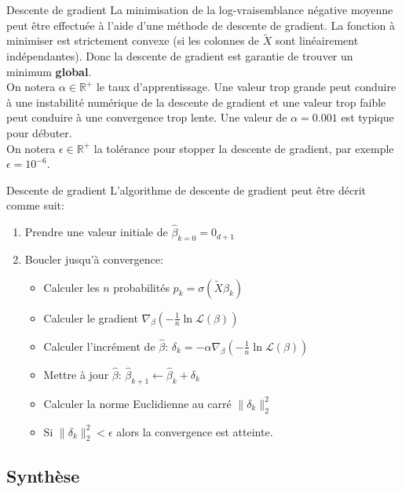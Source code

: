 \begin{frame}{Descente de gradient}
	La minimisation de la log-vraisemblance négative moyenne peut être effectuée à l'aide d'une méthode de descente de gradient. La fonction à minimiser est strictement convexe (si les colonnes de $\tilde{X}$ sont linéairement indépendantes). Donc la descente de gradient est garantie de trouver un minimum \textbf{global}. \\
	\vspace{0.5cm}
	On notera $\alpha \in \mathbb{R}^+$ le taux d'apprentissage. Une valeur trop grande peut conduire à une instabilité numérique de la descente de gradient et une valeur trop faible peut conduire à une convergence trop lente. Une valeur de $\alpha = 0.001$ est typique pour débuter. \\
	\vspace{0.5cm}
	On notera $\epsilon \in \mathbb{R}^+$ la tolérance pour stopper la descente de gradient, par exemple $\epsilon = 10^{-6}$.
\end{frame}

\begin{frame}{Descente de gradient}
	L'algorithme de descente de gradient peut être décrit comme suit:
	\begin{enumerate}
		\item Prendre une valeur initiale de $\hat{\beta}_{k=0} = 0_{d+1}$
		\item Boucler jusqu'à convergence:
		\begin{itemize}
			\item Calculer les $n$ probabilités $p_k = \sigma(\tilde{X} \beta_{k})$
			\item Calculer le gradient $\nabla_{\beta}\left(- \frac{1}{n} \ln{\mathcal{L}(\beta)}\right)$
			\item Calculer l'incrément de $\hat{\beta}$: $\delta_k = - \alpha \nabla_{\beta}\left(- \frac{1}{n} \ln{\mathcal{L}(\beta)}\right)$
			\item Mettre à jour $\hat{\beta}$: $\hat{\beta}_{k+1} \leftarrow \hat{\beta}_{k} + \delta_k$
			\item Calculer la norme Euclidienne au carré $\|\delta_k \|_2^2$
			\item Si $\|\delta_k \|_2^2 < \epsilon$ alors la convergence est atteinte.
		\end{itemize}
	\end{enumerate}
\end{frame}

\subsection[Synthèse]{Synthèse}

